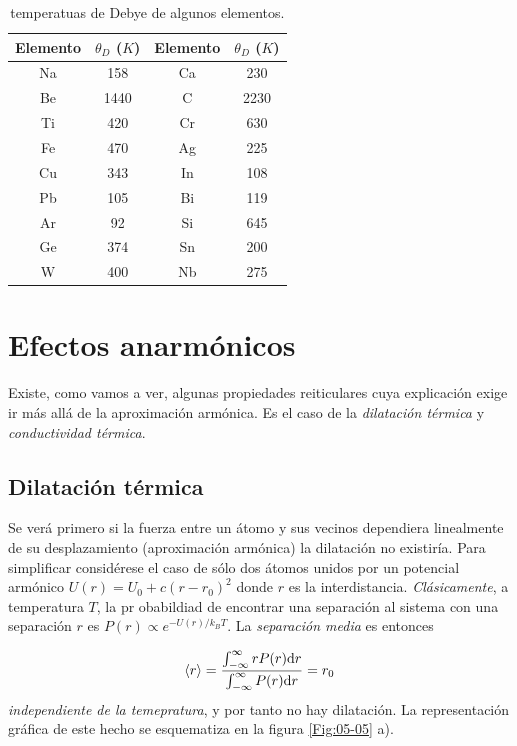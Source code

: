 \begin{table}[h!] \centering
\begin{tabular}{cccc}
    Elemento & $\theta_D$ ($K$) & Elemento & $\theta_D$ ($K$) \\ \hline
    Na & 158 & Ca & 230 \\
    Be & 1440 & C & 2230 \\
    Ti & 420 & Cr & 630 \\
    Fe & 470 & Ag & 225 \\
    Cu & 343 & In & 108 \\
    Pb & 105 & Bi & 119 \\
    Ar & 92 & Si & 645 \\
    Ge & 374 & Sn & 200 \\
    W & 400 & Nb & 275
\end{tabular}
\caption{temperatuas de Debye de algunos elementos.}
\label{Tab:05-01}
\end{table}

\section{Efectos anarmónicos}

Existe, como vamos a ver, algunas propiedades reiticulares cuya explicación exige ir más allá de la aproximación armónica. Es el caso de la \textit{dilatación térmica} y  \textit{conductividad térmica}.

\subsection{Dilatación térmica}

Se verá primero si la fuerza entre un átomo y sus vecinos dependiera linealmente de su desplazamiento (aproximación armónica) la dilatación no existiría. Para simplificar considérese el caso de sólo dos átomos unidos por un potencial armónico $U(r) = U_0 + c(r-r_0)^2$ donde $r$ es la interdistancia. \textit{Clásicamente}, a temperatura $T$, la pr obabildiad de encontrar una separación al sistema con una separación $r$ es $P(r)\propto e^{-U(r)/k_BT}$. La \textit{separación media} es entonces

\begin{equation}
    \langle r \rangle = \frac{\int_{-\infty}^{\infty} r P(r)\mathrm{d} r}{\int_{-\infty}^{\infty} P(r)\mathrm{d} r} = r_0 \label{Ec:05-03-01}
\end{equation}
\textit{independiente de la temepratura}, y por tanto no hay dilatación. La representación gráfica de este hecho se esquematiza en la figura \ref{Fig:05-05} a). 

